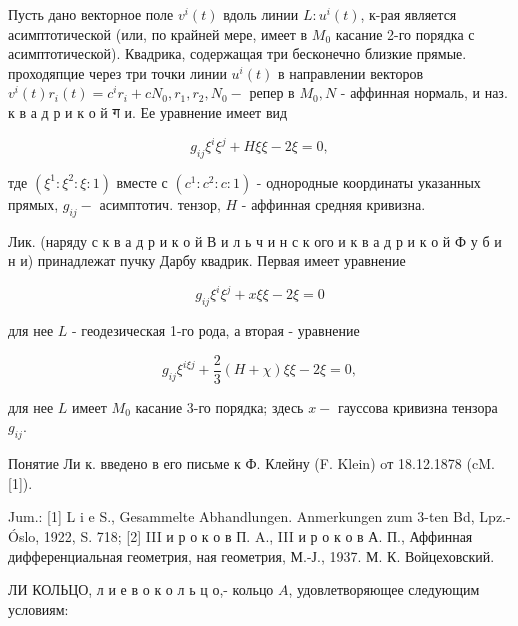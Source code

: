 \documentclass[10pt]{article}
\begin{document}
Пусть дано векторное поле $v^{i}(t)$ вдоль линии $L: u^{i}(t)$, к-рая является асимптотической (или, по крайней мере, имеет в $M_{0}$ касание 2-го порядка с асимптотической). Квадрика, содержащая три бесконечно близкие прямые. проходяпцие через три точки линии $u^{i}(t)$ в направлении векторов $v^{i}(t) r_{i}(t)=c^{i} r_{i}+c N_{0}, r_{1}, r_{2}, N_{0}-$ репер в $M_{0}, N$ - аффинная нормаль, и наз. к в а д р и к о й ग и. Ее уравнение имеет вид



\[

g_{i j} \xi^{i} \xi^{j}+H \xi \xi-2 \xi=0,

\]



тде $\left(\xi^{1}: \xi^{2}: \xi: 1\right)$ вместе с $\left(c^{1}: c^{2}: c: 1\right)$ - однородные координаты указанных прямых, $g_{i j}-$ асимптотич. тензор, $H$ - аффинная средняя кривизна.



Лик. (наряду с к в а д р и к о й В и л ь ч и н с к ого и к в а д р и к о й Ф у б и н и) принадлежат пучку Дарбу квадрик. Первая имеет уравнение



\[

g_{i j} \xi^{i} \xi^{j}+x \xi \xi-2 \xi=0

\]



для нее $L$ - геодезическая 1-го рода, а вторая - уравнение



\[

g_{i j} \xi^{i \xi j}+\frac{2}{3}(H+\chi) \xi \xi-2 \xi=0,

\]



для нее $L$ имеет $M_{0}$ касание 3-го порядка; здесь $x-$ гауссова кривизна тензора $g_{i j}$.



Понятие Ли к. введено в его письме к Ф. Клейну (F. Klein) oт 18.12.1878 (cM. [1]).



Jum.: [1] L i e S., Gesammelte Abhandlungen. Anmerkungen zum 3-ten Bd, Lpz.- Óslo, 1922, S. 718; [2] III и р о к о в П. A., III и р о к о в А. П., Аффинная дифференциальная геометрия, ная геометрия, М.-Ј., 1937. М. К. Войцеховский.



ЛИ КОЛЬЦО, л и е в о к о л ь ц о,- кольцо $A$, удовлетворяющее следующим условиям:
\end{document}

